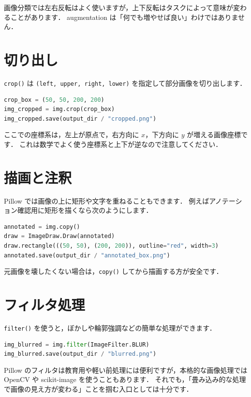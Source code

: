 画像分類では左右反転はよく使いますが，上下反転はタスクによって意味が変わることがあります．
augmentation は「何でも増やせば良い」わけではありません．


\section{切り出し}

\texttt{crop()} は \texttt{(left, upper, right, lower)} を指定して部分画像を切り出します．

\begin{lstlisting}[style=codecell,language=Python]
crop_box = (50, 50, 200, 200)
img_cropped = img.crop(crop_box)
img_cropped.save(output_dir / "cropped.png")
\end{lstlisting}

ここでの座標系は，左上が原点で，右方向に \(x\)，下方向に \(y\) が増える画像座標です．
これは数学でよく使う座標系と上下が逆なので注意してください．


\section{描画と注釈}

Pillow では画像の上に矩形や文字を重ねることもできます．
例えばアノテーション確認用に矩形を描くなら次のようにします．

\begin{lstlisting}[style=codecell,language=Python]
annotated = img.copy()
draw = ImageDraw.Draw(annotated)
draw.rectangle(((50, 50), (200, 200)), outline="red", width=3)
annotated.save(output_dir / "annotated_box.png")
\end{lstlisting}

元画像を壊したくない場合は，\texttt{copy()} してから描画する方が安全です．


\section{フィルタ処理}

\texttt{filter()} を使うと，ぼかしや輪郭強調などの簡単な処理ができます．

\begin{lstlisting}[style=codecell,language=Python]
img_blurred = img.filter(ImageFilter.BLUR)
img_blurred.save(output_dir / "blurred.png")
\end{lstlisting}

Pillow のフィルタは教育用や軽い前処理には便利ですが，本格的な画像処理では OpenCV や scikit-image を使うこともあります．
それでも，「畳み込み的な処理で画像の見え方が変わる」ことを掴む入口としては十分です．



